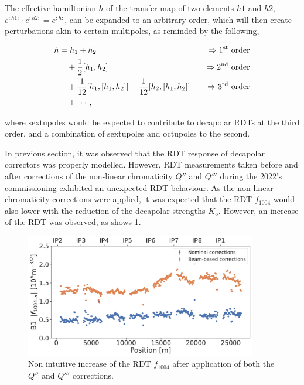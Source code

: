 The effective hamiltonian $h$ of the transfer map of two elements $h1$ and $h2$, $e^{:h1:} \cdot
e^{:h2:} = e^{:h:}$, can be expanded to an arbitrary order, which will then create perturbations
akin to certain multipoles, as reminded by the following,

\begin{equation}
    \begin{aligned}
        h &= h_1 + h_2 \quad &\Rightarrow \text{1\textsuperscript{st} order} \\
        &\quad + \frac{1}{2} [h_1, h_2] \quad &\Rightarrow \text{2\textsuperscript{nd} order} \\
        &\quad + \frac{1}{12} [h_1, [h_1, h_2]] - \frac{1}{12} [h_2, [h_1, h_2]] \quad &\Rightarrow \text{3\textsuperscript{rd} order} \\
        &\quad + \cdots,
    \end{aligned}
    \nonumber
\end{equation}

where sextupoles would be expected to contribute to decapolar RDTs at the third order, and a
combination of sextupoles and octupoles to the second.

In previous section, it was observed that the RDT response of decapolar correctors was properly
modelled. However, RDT measurements taken before and after corrections of the non-linear
chromaticity $Q''$ and $Q'''$ during the 2022's commissioning exhibited an unexpected RDT behaviour.
As the non-linear chromaticity corrections were applied, it was expected that the RDT $f_{1004}$
would also lower with the reduction of the decapolar strengths $K_5$. However, an increase of the
RDT was observed, as shows \cref{fig:decapoles:f1004_dq2_dq3}.

\begin{figure}[!htb]
    \centering
    \includegraphics[width=0.9\textwidth]{./images/f1004_dq2_dq3_2022.pdf}    
    \caption{Non intuitive increase of the RDT $f_{1004}$ after application of both the $Q''$ and
    $Q'''$ corrections.}
    \label{fig:decapoles:f1004_dq2_dq3}
\end{figure}


